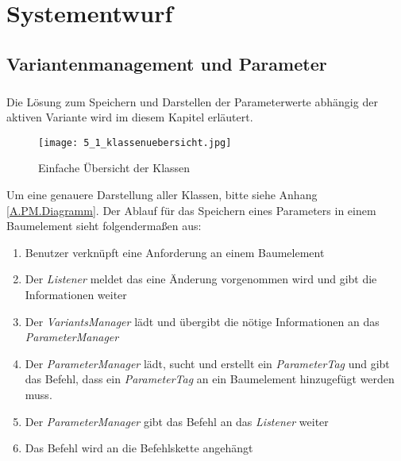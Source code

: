 \chapter{Systementwurf}\label{chp:systementwurf}


\section{Variantenmanagement und Parameter}
\paragraph{}

Die Lösung zum Speichern und Darstellen der Parameterwerte abhängig der aktiven Variante wird im diesem Kapitel erläutert.\\

\begin{figure}[h!]
  \begin{center}
    \texttt{[image: 5\_1\_klassenuebersicht.jpg]}
  		  \caption{Einfache Übersicht der Klassen}
     \label{ttn.verbindung.klassen.loesung}
  \end{center}
\end{figure}


Um eine genauere Darstellung aller Klassen, bitte siehe Anhang \ref{A.PM.Diagramm}. Der Ablauf für das Speichern eines Parameters in einem Baumelement sieht folgendermaßen aus:
\begin{enumerate}
\item Benutzer verknüpft eine Anforderung an einem Baumelement
\item Der \textit{Listener} meldet das eine Änderung vorgenommen wird und gibt die Informationen weiter
\item Der \textit{VariantsManager} lädt und übergibt die nötige Informationen an das \textit{ParameterManager}
\item Der \textit{ParameterManager} lädt, sucht und erstellt ein \textit{ParameterTag}  und gibt das Befehl, dass ein \textit{ParameterTag} an ein Baumelement hinzugefügt werden muss.
\item Der \textit{ParameterManager} gibt das Befehl an das \textit{Listener} weiter
\item Das Befehl wird an die Befehlskette angehängt
\end{enumerate}

